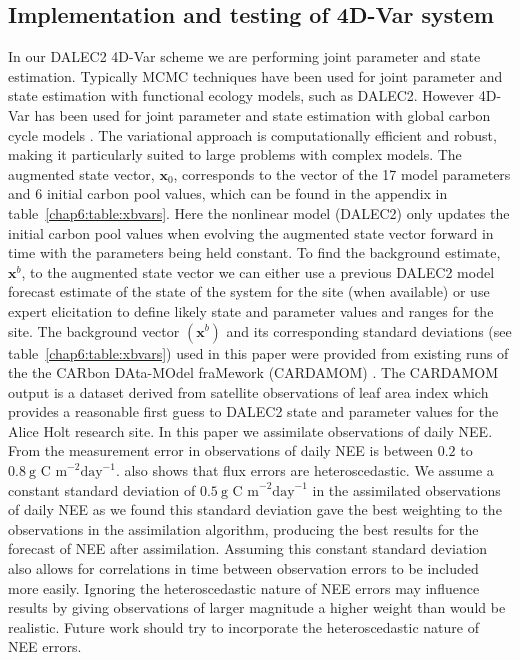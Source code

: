 \subsection{Implementation and testing of 4D-Var system} \label{chap6:sec:implement4dvar}

In our DALEC2 4D-Var scheme we are performing joint parameter and state estimation. Typically MCMC techniques have been used for joint parameter and state estimation with functional ecology models, such as DALEC2. However 4D-Var has been used for joint parameter and state estimation with global carbon cycle models \citep{Kaminski2013}. The variational approach is computationally efficient and robust, making it particularly suited to large problems with complex models. The augmented state vector, $\textbf{x}_0$, corresponds to the vector of the 17 model parameters and 6 initial carbon pool values, which can be found in the appendix in table~\ref{chap6:table:xbvars}. Here the nonlinear model (DALEC2) only updates the initial carbon pool values when evolving the augmented state vector forward in time with the parameters being held constant. To find the background estimate, $\textbf{x}^{b}$, to the augmented state vector we can either use a previous DALEC2 model forecast estimate of the state of the system for the site (when available) or use expert elicitation to define likely state and parameter values and ranges for the site. The background vector $(\textbf{x}^b)$ and its corresponding standard deviations (see table~\ref{chap6:table:xbvars}) used in this paper were provided from existing runs of the the CARbon DAta-MOdel fraMework (CARDAMOM) \citep{Exbrayat2015}. The CARDAMOM output is a dataset derived from satellite observations of leaf area index which provides a reasonable first guess to DALEC2 state and parameter values for the Alice Holt research site. In this paper we assimilate observations of daily NEE. From \citet{Richardson200838} the measurement error in observations of daily NEE is between $0.2$ to $0.8~\text{g C m}^{-2}\text{day}^{-1}$.  \citet{Richardson200838} also shows that flux errors are heteroscedastic. We assume a constant standard deviation of $0.5~\text{g C m}^{-2}\text{day}^{-1}$ in the assimilated observations of daily NEE as we found this standard deviation gave the best weighting to the observations in the assimilation algorithm, producing the best results for the forecast of NEE after assimilation. Assuming this constant standard deviation also allows for correlations in time between observation errors to be included more easily. Ignoring the heteroscedastic nature of NEE errors may influence results by giving observations of larger magnitude a higher weight than would be realistic. Future work should try to incorporate the heteroscedastic nature of NEE errors.

